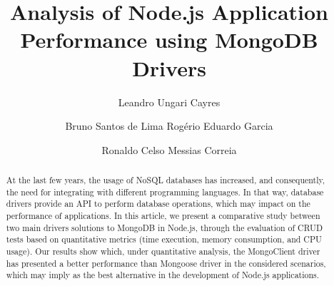 \documentclass{svproc}
\begin{document}
\mainmatter              %
%
\title{Analysis of Node.js Application Performance using MongoDB Drivers}
%
%
\author{Leandro Ungari Cayres \and Bruno Santos de Lima Rogério Eduardo Garcia \and Ronaldo Celso Messias Correia}
%
%
%

\maketitle %

\begin{abstract}
At the last few years, the usage of NoSQL databases has increased, and consequently, the need for integrating with different programming languages. In that way, database drivers provide an API to perform database operations, which may impact on the performance of applications. In this article, we present a comparative study between two main drivers solutions to MongoDB in Node.js, through the evaluation of CRUD tests based on quantitative metrics (time execution, memory consumption, and CPU usage). Our results show which, under quantitative analysis, the MongoClient driver has presented a better performance than Mongoose driver in the considered scenarios, which may imply as the best alternative in the development of Node.js applications.
\end{abstract}
%
\end{document}
